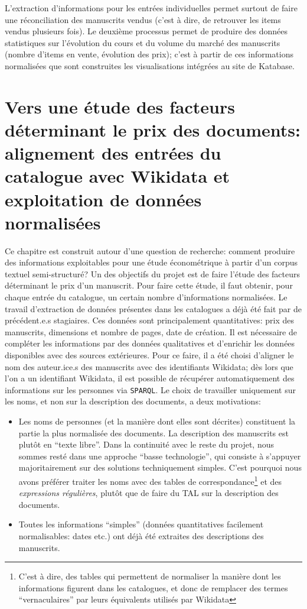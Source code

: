 \documentclass[a4paper, 12pt, twoside]{book}
\newcommand{\rgx}{\textit{expressions régulières}}
\newcommand{\sparql}{\texttt{SPARQL}}
\begin{document}
L'extraction d'informations pour les entrées individuelles permet surtout de faire une réconciliation des manuscrits vendus (c'est à dire, de retrouver les items vendus plusieurs fois). Le deuxième processus permet de produire des données statistiques sur l'évolution du cours et du volume du marché des manuscrits (nombre d'items en vente, évolution des prix); c'est à partir de ces informations normalisées que sont construites les visualisations intégrées au site de Katabase.


\chapter{Vers une étude des facteurs déterminant le prix des documents: alignement des entrées du catalogue avec Wikidata et exploitation de données normalisées}
Ce chapitre est construit autour d'une question de recherche: comment produire des informations exploitables pour une étude économétrique à partir d'un corpus textuel semi-structuré? Un des objectifs du projet est de faire l'étude des facteurs déterminant le prix d'un manuscrit. Pour faire cette étude, il faut obtenir, pour chaque entrée du catalogue, un certain nombre d'informations normalisées. Le travail d'extraction de données présentes dans les catalogues a déjà été fait par de précédent.e.s stagiaires. Ces données sont principalement quantitatives: prix des manuscrits, dimensions et nombre de pages, date de création. Il est nécessaire de compléter les informations par des données qualitatives et d'enrichir les données disponibles avec des sources extérieures. Pour ce faire, il a été choisi d'aligner le nom des auteur.ice.s des manuscrits avec des identifiants Wikidata; dès lors que l'on a un identifiant Wikidata, il est possible de récupérer automatiquement des informations sur les personnes via \sparql. Le choix de travailler uniquement sur les noms, et non sur la description des documents, a deux motivations:
\begin{itemize}
 \item Les noms de personnes (et la manière dont elles sont décrites) constituent la partie la plus normalisée des documents. La description des manuscrits est plutôt en \enquote{texte libre}. Dans la continuité avec le reste du projet, nous sommes resté dans une approche \enquote{basse technologie}, qui consiste à s'appuyer majoritairement sur des solutions techniquement simples. C'est pourquoi nous avons préférer traiter les noms avec des tables de correspondance\footnote{C'est à dire, des tables qui permettent de normaliser la manière dont les informations figurent dans les catalogues, et donc de remplacer des termes \enquote{vernaculaires} par leurs équivalents utilisés par Wikidata} et des \rgx{}, plutôt que de faire du TAL sur la description des documents.
 \item Toutes les informations \enquote{simples} (données quantitatives facilement normalisables: dates etc.) ont déjà été extraites des descriptions des manuscrits.
\end{itemize}
\end{document}
